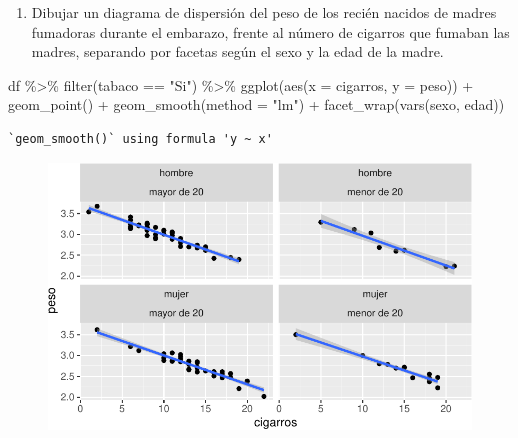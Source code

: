 \documentclass[
  a4paper,
]{scrreport}
\newenvironment{Shaded}{\begin{snugshade}}{\end{snugshade}}
\newcommand{\AttributeTok}[1]{\textcolor[rgb]{0.40,0.45,0.13}{#1}}
\newcommand{\FunctionTok}[1]{\textcolor[rgb]{0.28,0.35,0.67}{#1}}
\newcommand{\NormalTok}[1]{\textcolor[rgb]{0.00,0.23,0.31}{#1}}
\newcommand{\SpecialCharTok}[1]{\textcolor[rgb]{0.37,0.37,0.37}{#1}}
\newcommand{\StringTok}[1]{\textcolor[rgb]{0.13,0.47,0.30}{#1}}
\providecommand{\tightlist}{%
  \setlength{\itemsep}{0pt}\setlength{\parskip}{0pt}}\usepackage{longtable,booktabs,array}
\theoremstyle{definition}
\theoremstyle{definition}
\theoremstyle{remark}
\begin{document}
\begin{enumerate}
\def\labelenumi{\alph{enumi}.}
\setcounter{enumi}{7}
\tightlist
\item
  Dibujar un diagrama de dispersión del peso de los recién nacidos de
  madres fumadoras durante el embarazo, frente al número de cigarros que
  fumaban las madres, separando por facetas según el sexo y la edad de
  la madre.
\end{enumerate}

\begin{tcolorbox}[enhanced jigsaw, rightrule=.15mm, titlerule=0mm, colbacktitle=quarto-callout-note-color!10!white, toprule=.15mm, coltitle=black, bottomtitle=1mm, opacityback=0, toptitle=1mm, title=\textcolor{quarto-callout-note-color}{\faInfo}\hspace{0.5em}{Solución}, left=2mm, colback=white, breakable, colframe=quarto-callout-note-color-frame, leftrule=.75mm, opacitybacktitle=0.6, arc=.35mm, bottomrule=.15mm]

\begin{Shaded}
\begin{Highlighting}[]
\NormalTok{df }\SpecialCharTok{\%\textgreater{}\%} 
    \FunctionTok{filter}\NormalTok{(tabaco }\SpecialCharTok{==} \StringTok{"Si"}\NormalTok{) }\SpecialCharTok{\%\textgreater{}\%}
    \FunctionTok{ggplot}\NormalTok{(}\FunctionTok{aes}\NormalTok{(}\AttributeTok{x =}\NormalTok{ cigarros, }\AttributeTok{y =}\NormalTok{ peso)) }\SpecialCharTok{+}
        \FunctionTok{geom\_point}\NormalTok{() }\SpecialCharTok{+}
        \FunctionTok{geom\_smooth}\NormalTok{(}\AttributeTok{method =} \StringTok{"lm"}\NormalTok{) }\SpecialCharTok{+}
        \FunctionTok{facet\_wrap}\NormalTok{(}\FunctionTok{vars}\NormalTok{(sexo, edad))}
\end{Highlighting}
\end{Shaded}

\begin{verbatim}
`geom_smooth()` using formula 'y ~ x'
\end{verbatim}

\begin{figure}[H]

{\centering \includegraphics{./07-graficos_files/figure-pdf/unnamed-chunk-41-1.pdf}

}

\end{figure}

\end{tcolorbox}
\end{document}
